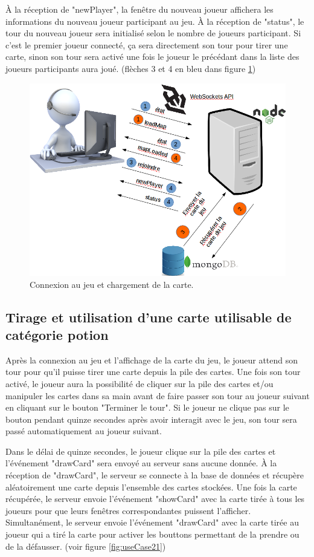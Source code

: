 \documentclass[12pt]{report}
\begin{document}
			À la réception de "newPlayer", la fenêtre du nouveau joueur affichera les informations du nouveau joueur participant au jeu. À la réception de "status", le tour du nouveau joueur sera initialisé selon le nombre de joueurs participant. Si c'est le premier joueur connecté, ça sera directement son tour pour tirer une carte, sinon son tour sera activé une fois le joueur le précédant dans la liste des joueurs participants aura joué. (flèches 3 et 4 en bleu dans figure \ref{fig:useCase1})

			\begin{figure}[h!]
		  	\centering
		    \includegraphics[scale=0.5]{images/useCase1.png}
		    \caption{Connexion au jeu et chargement de la carte.}
				\label{fig:useCase1}
		  \end{figure}

			\subsection{Tirage et utilisation d'une carte utilisable de catégorie potion}
			Après la connexion au jeu et l'affichage de la carte du jeu, le joueur attend son tour pour qu'il puisse tirer une carte depuis la pile des cartes. Une fois son tour activé, le joueur aura la possibilité de cliquer sur la pile des cartes et/ou manipuler les cartes dans sa main avant de faire passer son tour au joueur suivant en cliquant sur le bouton "Terminer le tour". Si le joueur ne clique pas sur le bouton pendant quinze secondes après avoir interagit avec le jeu, son tour sera passé automatiquement au joueur suivant.

			Dans le délai de quinze secondes, le joueur clique sur la pile des cartes et l'événement "drawCard" sera envoyé au serveur sans aucune donnée. À la réception de "drawCard", le serveur se connecte à la base de données et récupère aléatoirement une carte depuis l'ensemble des cartes stockées. Une fois la carte récupérée, le serveur envoie l'événement "showCard" avec la carte tirée à tous les joueurs pour que leurs fenêtres correspondantes puissent l'afficher. Simultanément, le serveur envoie l'événement "drawCard" avec la carte tirée au joueur qui a tiré la carte pour activer les bouttons permettant de la prendre ou de la défausser. (voir figure \ref{fig:useCase21})
\end{document}
